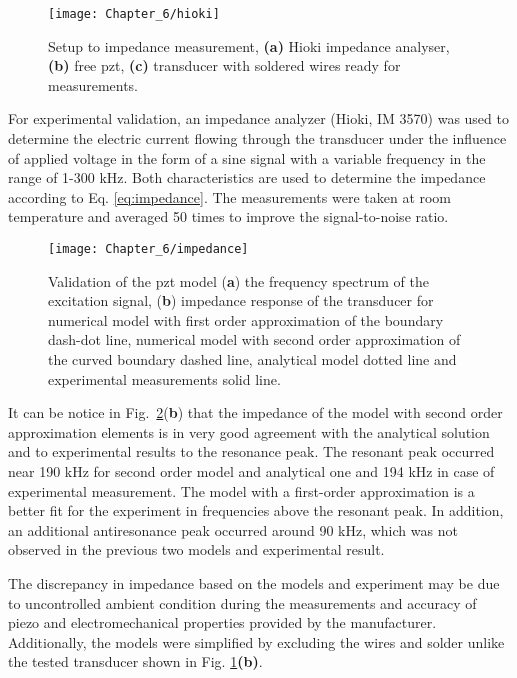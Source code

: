 \begin{figure}[H]
	\begin{center}
		\texttt{[image: Chapter\_6/hioki]}
	\end{center}
	\caption{Setup to impedance measurement, \textbf{(a)} Hioki impedance analyser, \textbf{(b)} free \ac{pzt}, \textbf{(c)} transducer with soldered wires ready for measurements.}
	\label{fig:hioki}
\end{figure}
For experimental validation, an impedance analyzer (Hioki, IM 3570) was used to determine the electric current flowing through the transducer under the influence of applied voltage in the form of a sine signal with a variable frequency in the range of 1-300 \unit{\kHz}.
Both characteristics are used to determine the impedance according to Eq. \ref{eq:impedance}.
The measurements were taken at room temperature and averaged 50 times to improve the signal-to-noise ratio.

\begin{figure}[H]
	\begin{center}
		\texttt{[image: Chapter\_6/impedance]}
	\end{center}
	\caption{Validation of the \acf{pzt} model (\textbf{a}) the frequency spectrum of the excitation signal, (\textbf{b}) impedance response of the transducer for numerical model with first order approximation of the boundary dash-dot line, numerical model with second order approximation of the curved boundary dashed line, analytical model dotted line and experimental measurements solid line.}
	\label{fig:impedance}
\end{figure}

It can be notice in Fig.~\ref{fig:impedance}(\textbf{b}) that the impedance of the model with second order approximation elements is in very good agreement with the analytical solution and to experimental results to the resonance peak.
The resonant peak occurred near 190 \unit{\kHz} for second order model and analytical one and 194 \unit{\kHz} in case of experimental measurement.
The model with a first-order approximation is a better fit for the experiment in frequencies above the resonant peak.
In addition, an additional antiresonance peak occurred around 90 \unit{\kHz}, which was not observed in the previous two models and experimental result.

The discrepancy in impedance based on the models and experiment may be due to uncontrolled ambient condition during the measurements and accuracy of piezo and electromechanical properties provided by the manufacturer. 
Additionally, the models were simplified by excluding the wires and solder unlike the tested transducer shown in Fig. \ref{fig:hioki}\textbf{(b)}.

